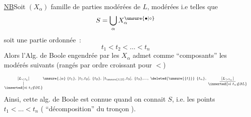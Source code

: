 \uline{NB}\qquad Soit $(X_\alpha)$ famille  de parties modérées de $L$,   modérées i.e telles que
\[
S=\bigcup_\alpha X_\alpha^{\unsure{\bullet|\circ}}
\]
soit une partie  ordonnée~:
\[
t_1<t_2<\ldots<t_n
\]
Alors l'Alg. de Boole engendrée par les $X_\alpha$  admet comme   ``composants'' les  modérés  suivants (rangés par ordre croissant pour $<$)
\[
\scriptstyle
\underset{\substack{\vert\\\inserted{\text{si }t_1\notin\partial L}}}{[L_{<t_1}]}\unsure{,|a}\;
\{t_1\},\ ]t_1,t_2[,\ \{t_2\},\ ]t_{\unsure{1|2}},t_3[,\ \{t_3\},\ldots,\
\deleted{\unsure{\{t\}}}\ \{t_n\},\
\underset{\substack{\rule{3em}{0.35pt}\\\inserted{\text{si }t_n\notin\partial L}}}{[L_{>t_n}]}
\]
Ainsi, cette alg. de Boole est connue quand on connait $S$, i.e. les points $t_1<\ldots<t_n$ ( ``décomposition''  du tronçon ).


